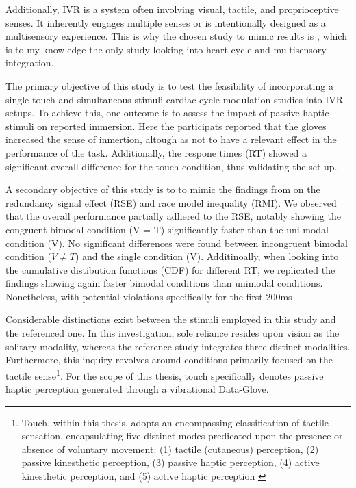 \documentclass[12pt,oneside,openright]{report}
\begin{document}
Additionally, IVR is a system often involving visual, tactile, and proprioceptive senses. It inherently engages multiple senses or is intentionally designed as a multisensory experience. This is why the chosen study to mimic results is \textcite{SALTAFOSSI2023108642}, which is to my knowledge the only study looking into heart cycle and multisensory integration. 

The primary objective of this study is to test the feasibility of incorporating a single touch and simultaneous stimuli cardiac cycle modulation studies into IVR setups.
To achieve this, one outcome is to assess the impact of passive haptic stimuli on reported immersion. Here the participats reported that the gloves increased the sense of inmertion, altough as not to have a relevant effect in the performance of the task. Additionally, the respone times (RT) showed a significant overall difference for the touch condition, thus validating the set up.

A secondary objective of this study is to to mimic the findings from \textcite{SALTAFOSSI2023108642} on the redundancy signal effect (RSE) and race model inequality (RMI). We observed that the overall performance partially adhered to the RSE, notably showing the congruent bimodal condition (V = T) significantly faster than the uni-modal condition (V). No significant differences were found between incongruent bimodal condition ($V \neq T$) and the single condition (V). Additinoally, when looking into the cumulative distibution functions (CDF) for different RT, we replicated the findings showing again faster bimodal conditions than unimodal conditions. Nonetheless, with potential violations specifically for the first 200ms


Considerable distinctions exist between the stimuli employed in this study and the referenced one. In this investigation, sole reliance resides upon vision as the solitary modality, whereas the reference study integrates three distinct modalities. Furthermore, this inquiry revolves around conditions primarily focused on the tactile sense\footnote{Touch, within this thesis, adopts an encompassing classification of tactile sensation, encapsulating five distinct modes predicated upon the presence or absence of voluntary movement: (1) tactile (cutaneous) perception, (2) passive kinesthetic perception, (3) passive haptic perception, (4) active kinesthetic perception, and (5) active haptic perception \parencite{Healy2003HandbookOP}}. For the scope of this thesis, touch specifically denotes passive haptic perception generated through a vibrational Data-Glove.
\end{document}
